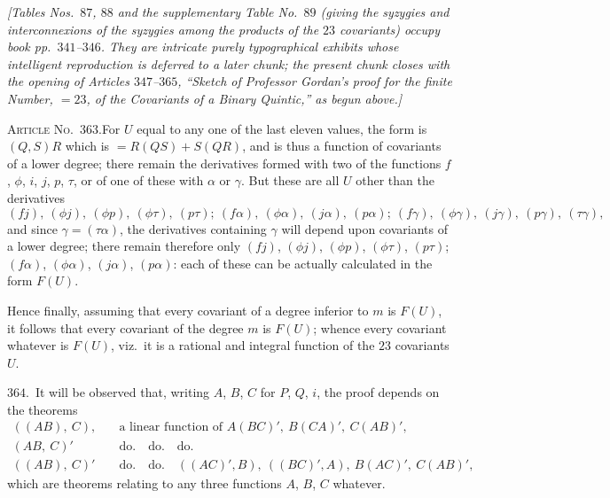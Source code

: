 \documentclass[11pt,a4paper]{article}
\begin{document}
\medskip

\noindent\textit{[Tables Nos.~$87$, $88$ and the supplementary Table
No.~$89$ (giving the syzygies and interconnexions of the syzygies among the
products of the $23$ covariants) occupy book pp.~$341$--$346$. They are
intricate purely typographical exhibits whose intelligent reproduction is
deferred to a later chunk; the present chunk closes with the opening of
Articles $347$--$365$, ``Sketch of Professor Gordan's proof for the finite
Number, $=23$, of the Covariants of a Binary Quintic,'' as begun above.]}

\medskip

\textsc{Article No.~$363$.}\quad For $U$ equal to any one of the last
eleven values, the form is $(Q,S)R$ which is $=R(QS)+S(QR)$, and is thus
a function of covariants of a lower degree; there remain the derivatives
formed with two of the functions $f$, $\phi$, $i$, $j$, $p$, $\tau$, or
of one of these with $\alpha$ or $\gamma$. But these are all $U$ other
than the derivatives
\[
(fj),\ (\phi j),\ (\phi p),\ (\phi\tau),\ (p\tau);\
(f\alpha),\ (\phi\alpha),\ (j\alpha),\ (p\alpha);\
(f\gamma),\ (\phi\gamma),\ (j\gamma),\ (p\gamma),\ (\tau\gamma),
\]
and since $\gamma = (\tau\alpha)$, the derivatives containing $\gamma$
will depend upon covariants of a lower degree; there remain therefore
only $(fj)$, $(\phi j)$, $(\phi p)$, $(\phi\tau)$, $(p\tau)$;
$(f\alpha)$, $(\phi\alpha)$, $(j\alpha)$, $(p\alpha)$: each of these
can be actually calculated in the form $F(U)$.

Hence finally, assuming that every covariant of a degree inferior to $m$
is $F(U)$, it follows that every covariant of the degree $m$ is $F(U)$;
whence every covariant whatever is $F(U)$, viz.\ it is a rational and
integral function of the $23$ covariants $U$.

\medskip

\noindent$364$.\ It will be observed that, writing $A$, $B$, $C$ for $P$,
$Q$, $i$, the proof depends on the theorems
\[
\begin{aligned}
((AB),\ C),& \quad\text{a linear function of }A(BC)',\ B(CA)',\ C(AB)',\\
(AB,\ C)' & \quad\text{do.}\quad\text{do.}\quad\text{do.}\\
((AB),\ C)' & \quad\text{do.}\quad\text{do.}\quad ((AC)',B),\ ((BC)',A),\
B(AC)',\ C(AB)',
\end{aligned}
\]
which are theorems relating to any three functions $A$, $B$, $C$ whatever.

\medskip
\end{document}
